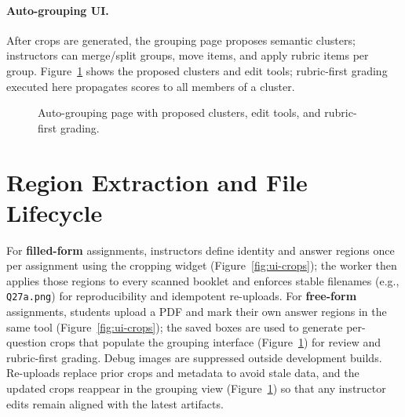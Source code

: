 \documentclass[ms,twoside,print]{nuthesis}
\begin{document}
\paragraph{Auto-grouping UI.}
After crops are generated, the grouping page proposes semantic clusters; instructors can merge/split groups, move items, and apply rubric items per group. Figure~\ref{fig:ui-grouping} shows the proposed clusters and edit tools; rubric-first grading executed here propagates scores to all members of a cluster.

\begin{figure}[htb]
  \centering
  \caption{Auto-grouping page with proposed clusters, edit tools, and rubric-first grading.}
  \label{fig:ui-grouping}
\end{figure}

\section{Region Extraction and File Lifecycle}
For \textbf{filled-form} assignments, instructors define identity and answer regions once per assignment using the cropping widget (Figure~\ref{fig:ui-crops}); the worker then applies those regions to every scanned booklet and enforces stable filenames (e.g., \texttt{Q27a.png}) for reproducibility and idempotent re-uploads. For \textbf{free-form} assignments, students upload a PDF and mark their own answer regions in the same tool (Figure~\ref{fig:ui-crops}); the saved boxes are used to generate per-question crops that populate the grouping interface (Figure~\ref{fig:ui-grouping}) for review and rubric-first grading. Debug images are suppressed outside development builds. Re-uploads replace prior crops and metadata to avoid stale data, and the updated crops reappear in the grouping view (Figure~\ref{fig:ui-grouping}) so that any instructor edits remain aligned with the latest artifacts.
\end{document}
